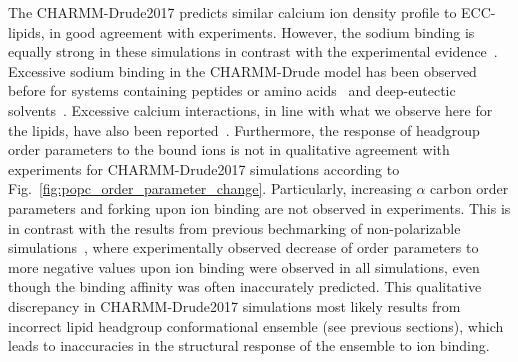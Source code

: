 \documentclass[journal=jacsat,manuscript=article,layout=singlecolumn]{achemso}
\begin{document}
The CHARMM-Drude2017 predicts similar calcium ion density profile to ECC-lipids, in good agreement with experiments. However, the sodium binding is equally strong in these simulations in contrast with the experimental evidence~\cite{Catte2016}. 
Excessive sodium binding in the CHARMM-Drude model has been observed before for systems containing peptides or amino acids~\cite{Ngo2019, Kav2022} and deep-eutectic solvents~\cite{shayestehpour2022ion}. Excessive calcium interactions, in line with what we observe here for the lipids, have also been reported~\cite{Tan2022}. Furthermore, the response of headgroup order parameters to the bound ions is not in qualitative agreement with experiments for CHARMM-Drude2017 simulations according to Fig.~\ref{fig:popc_order_parameter_change}. Particularly, increasing $\alpha$ carbon order parameters and forking upon ion binding are not observed in experiments. This is in contrast with the results from previous bechmarking of non-polarizable simulations~\cite{Catte2016}, where experimentally observed decrease of order parameters to more negative values upon ion binding were observed in all simulations, even though the binding affinity was often inaccurately predicted. This qualitative discrepancy in CHARMM-Drude2017 simulations most likely results from incorrect lipid headgroup conformational ensemble (see previous sections), which leads to inaccuracies in the structural response of the ensemble to ion binding. 
\end{document}
